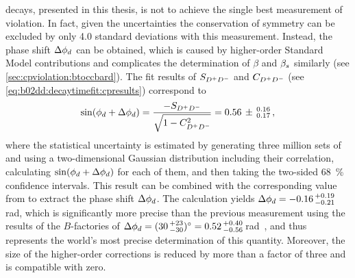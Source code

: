 decays, presented in this thesis, is not to achieve the single best
measurement of \CP violation. In fact, given the uncertainties the
conservation of \CP symmetry can be excluded by only \num{4.0} standard
deviations with this measurement. Instead, the phase shift $\Delta\phid$ can be
obtained, which is caused by higher-order Standard Model contributions and
complicates the determination of $\beta$ and $\betas$ similarly (see
\cref{sec:cpviolation:btoccbard}). The fit results of $\SDD$ and $\CDD$ (see
\cref{eq:b02dd:decaytimefit:cpresults}) correspond to
\begin{align*}
  \sin(\phid + \Delta \phid) = \frac{-\SDD}{\sqrt{1 - \CDD^2}} = 0.56\,\pm\,^{0.16}_{0.17}\,,
\end{align*}
where the statistical uncertainty is estimated by generating three million
sets of \SDD and \CDD using a two-dimensional Gaussian distribution including
their correlation, calculating $\sin(\phid + \Delta \phid)$ for each of them,
and then taking the two-sided \SI{68}{\percent} confidence intervals. This
result can be combined with the corresponding value from \BdToJPsiKS to
extract the phase shift $\Delta \phid$. The calculation yields $\Delta \phid =
-0.16\,^{+0.19}_{-0.21}$\,\si{\radian}, which is significantly more precise
than the previous measurement using the results of the $B$-factories of
$\Delta \phid = (30\,^{+23}_{-30})\si{\degrees} =
0.52\,^{+0.40}_{-0.56}$\,\si{\radian}~\cite{Bel:2015wha}, and thus represents
the world's most precise determination of this quantity. Moreover, the size of
the higher-order corrections is reduced by more than a factor of three and is
compatible with zero.